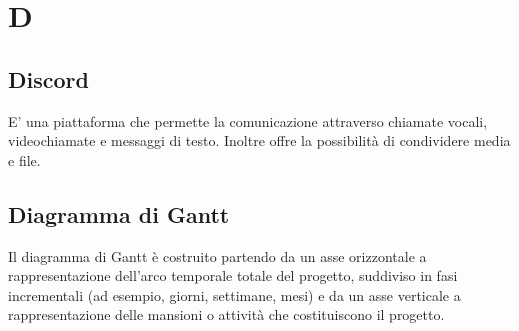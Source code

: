 \section{D}
\subsection{Discord}%
E' una piattaforma che permette la comunicazione attraverso chiamate vocali, videochiamate e messaggi di testo.  Inoltre offre la possibilità di condividere media e file.
\subsection{Diagramma di Gantt}%
Il diagramma di Gantt è costruito partendo da un asse orizzontale a rappresentazione dell'arco temporale totale del progetto, suddiviso in fasi incrementali (ad esempio, giorni, settimane, mesi) e da un asse verticale a rappresentazione delle mansioni o attività che costituiscono il progetto.
\clearpage